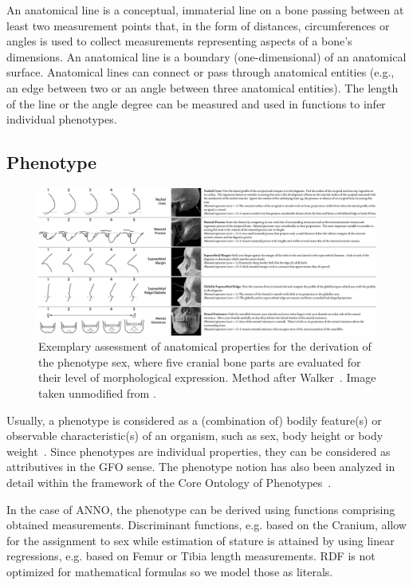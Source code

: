\documentclass[sw]{iosart2x}
\begin{document}
An anatomical line is a conceptual, immaterial line on a bone passing between at least two measurement points that, in the form of distances, circumferences or angles is used to collect measurements representing aspects of a bone's dimensions.
An anatomical line is a boundary (one-dimensional) of an anatomical surface.
Anatomical lines can connect or pass through anatomical entities (e.g., an edge between two or an angle between three anatomical entities).
The length of the line or the angle degree can be measured and used in functions to infer individual phenotypes.%

\subsection{Phenotype}
\begin{figure}[h]
\includegraphics[width=\textwidth]{img/phenotype.png}
\caption{
Exemplary assessment of anatomical properties for the derivation of the phenotype sex, where five cranial bone parts are evaluated for their level of morphological expression.
Method after Walker~\cite{datacollection}.
Image taken unmodified from \cite{datacollection}.
}\label{fig:phenotype}
\end{figure}


Usually, a phenotype is considered as a (combination of) bodily feature(s) or observable characteristic(s) of an organism, such as sex, body height or body weight~\citep{ontologicaltreatment,phenomes,interoperability}.
Since phenotypes are individual properties, they can be considered as attributives in the GFO sense.
The phenotype notion has also been analyzed in detail within the framework of the Core Ontology of Phenotypes~\citep{ontologicalrepresentation}.

In the case of ANNO, the phenotype can be derived using functions comprising obtained measurements.
Discriminant functions, e.g. based on the Cranium, allow for the assignment to sex while estimation of stature is attained by using linear regressions, e.g. based on Femur or Tibia length measurements.
RDF is not optimized for mathematical formulas so we model those as literals.
\end{document}
